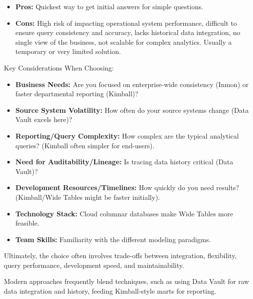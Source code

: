 \begin{enumerate}
\begin{itemize}
        \item \textbf{Pros:} Quickest way to get initial answers
        for simple questions.

        \item \textbf{Cons:} High risk of impacting operational
        system performance, difficult to ensure query consistency
        and accuracy, lacks historical data integration, no single
        view of the business, not scalable for complex analytics.
        Usually a temporary or very limited solution.
    \end{itemize}

\end{enumerate}

Key Considerations When Choosing:
\begin{itemize}
    \item \textbf{Business Needs:}  Are you focused on enterprise-wide
    consistency (Inmon) or faster departmental reporting (Kimball)?

    \item \textbf{Source System Volatility:} How often do your source
    systems change (Data Vault excels here)?

    \item \textbf{Reporting/Query Complexity:} How complex are the
    typical analytical queries? (Kimball often simpler for end-users).

    \item \textbf{Need for Auditability/Lineage:} Is tracing data history
    critical (Data Vault)?
    
    \item \textbf{Development Resources/Timelines:} How quickly do you need
    results? (Kimball/Wide Tables might be faster initially).
    
    \item \textbf{Technology Stack:} Cloud columnar databases make Wide
    Tables more feasible.
    
    \item \textbf{Team Skills:} Familiarity with the different modeling paradigms.
    
\end{itemize}
Ultimately, the choice often involves trade-offs between integration,
flexibility, query performance, development speed, and maintainability.

Modern approaches frequently blend techniques, such as using Data Vault
for raw data integration and history, feeding Kimball-style marts for reporting.











